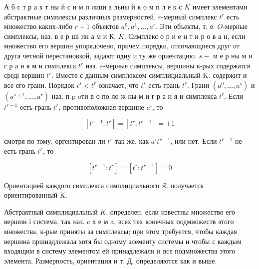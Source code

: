 \documentclass[10pt]{article}
\begin{document}
А б с т р а к т ны й с и м п лици а льны й к о м п л е к с $K$ имеет элементами абстрактные симплексы различных размерностей. $r$-мерный симплекс $t^{r}$ есть множество каких-либо $r+1$ объектов $a^{0}, a^{1}, \ldots, a^{r}$. Эти объекты, т. е. $O$-мерные симплексы, наз. в е р ші ин а м и К. $K$. Симплекс о р и е н т и р о в а н, если множество его вершин упорядочено, причем порядки, отличающиеся друг от друга четной перестановкой, задают одну и ту же ориентацию. $s-$ м е р ны м и г р а н я м и симплекса $t^{r}$ наз. $s$-мерные симплексы, вершины к-рых содержатся среді вершин $t^{r}$. Вместе с данным симплексом симплициальный $\mathrm{K}$. содержит и все его грани. Порядок $t^{s}<t^{r}$ означает, что $t^{s}$ есть грань $t^{r}$. Грани $\left(a^{0}, \ldots, a^{s}\right)$ и $\left(a^{s+1}, \ldots, a^{r}\right)$ наз. п $\mathrm{p}$ oти в о по ло ж ны м и г р а н я и симплекса $t^{r}$. Если $t^{r-1}$ есть грань $t^{r}$, противоположная вершине $a^{i}$, то



\[

\left[t^{r-1}: t^{r}\right]=\left[t^{r}: t^{r-1}\right]= \pm 1

\]



смотря по тому, оргентирован ли $t^{r}$ так же, как $a^{i} t^{r-1}$, или нет. Если $t^{r-1}$ не есть грань $t^{r}$, то



\[

\left[t^{r-1}: t^{r}\right]=\left[t^{r}: t^{r-1}\right]=0

\]



Ориентацией каждого симплекса симплициального $\mathfrak{K}$. получается ориентированный $\mathrm{K}$.



Абстрактный симплициальный $K$. определен, если известны множество его вершин і система, так наз. c х е м a, всех тех конечных подмножеств этого множества, к-рые приняты за симплексы; при этом требуется, чтобы каждая вершина пршнадлежала хотя бы одному элементу системы и чтобы с каждым входящим в систему элементом ей принадлежали и все подмножества этого элемента. Размерность, ориентация и т. Д. определяются как и выше.
\end{document}
